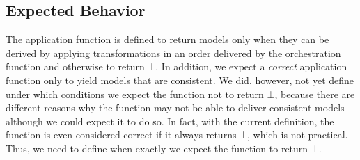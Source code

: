 




\subsection{Expected Behavior} %

The application function is defined to return models only when they can be derived by applying transformations in an order delivered by the orchestration function and otherwise to return $\bot$.
In addition, we expect a \emph{correct} application function only to yield models that are consistent.
We did, however, not yet define under which conditions we expect the function not to return $\bot$, because there are different reasons why the function may not be able to deliver consistent models although we could expect it to do so.
In fact, with the current definition, the function is even considered correct if it always returns $\bot$, which is not practical.
Thus, we need to define when exactly we expect the function to return $\bot$.

